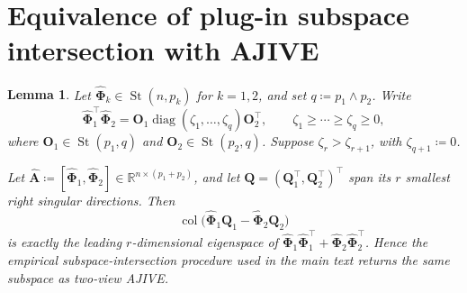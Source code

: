 \documentclass[11pt]{article}
\newtheorem{lemma}{Lemma}
\newcommand{\trans}{\top}
\DeclareMathOperator{\diag}{diag}
\begin{document}






\newpage
\appendix


\section{Equivalence of plug-in subspace intersection with AJIVE}
\label{sec:AJIVE}

\begin{lemma}
\label{lem:ajive-equivalence}
Let
$\widehat{\bm\Phi}_k\in\operatorname{St}(n,p_k)$ for $k=1,2$, and set
$q\coloneqq p_1\wedge p_2$.  Write
\[
  \widehat{\bm\Phi}_1^\trans\widehat{\bm\Phi}_2
  =
  \bm O_1
  \diag(\zeta_1,\ldots,\zeta_q)
  \bm O_2^\trans,
  \qquad
  \zeta_1\ge\cdots\ge\zeta_q\ge0,
\]
where
$\bm O_1\in\operatorname{St}(p_1,q)$ and
$\bm O_2\in\operatorname{St}(p_2,q)$.
Suppose $\zeta_r>\zeta_{r+1}$, with $\zeta_{q+1}\coloneqq0$.

Let
$\widehat{\bm A}\coloneqq
[\widehat{\bm\Phi}_1,\widehat{\bm\Phi}_2]
\in\mathbb R^{n\times(p_1+p_2)}$,
and let
$\bm Q=(\bm Q_1^\trans,\bm Q_2^\trans)^\trans$
span its $r$ smallest right singular directions.  Then
\[
  \operatorname{col}
  \bigl(
    \widehat{\bm\Phi}_1\bm Q_1
    -
    \widehat{\bm\Phi}_2\bm Q_2
  \bigr)
\]
is exactly the leading $r$-dimensional eigenspace of 
$  \widehat{\bm\Phi}_1\widehat{\bm\Phi}_1^\trans
  +
  \widehat{\bm\Phi}_2\widehat{\bm\Phi}_2^\trans
$.
Hence the empirical subspace-intersection procedure used in the main text
returns the same subspace as two-view AJIVE.
\end{lemma}
\end{document}
